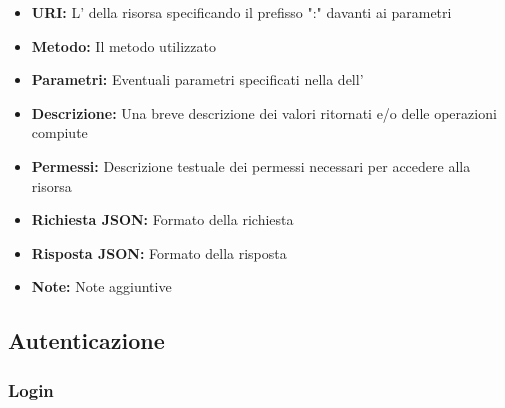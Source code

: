         \begin{itemize}
            \item \textbf{URI:} L' della risorsa specificando il prefisso
                ":" davanti ai parametri
            \item \textbf{Metodo:} Il metodo  utilizzato
            \item \textbf{Parametri:} Eventuali parametri specificati nella 
                dell'
            \item \textbf{Descrizione:} Una breve descrizione dei valori ritornati e/o delle
                operazioni compiute
            \item \textbf{Permessi:} Descrizione testuale dei permessi necessari
                per accedere alla risorsa
            \item \textbf{Richiesta JSON:} Formato della richiesta 
            \item \textbf{Risposta JSON:} Formato della risposta 
            \item \textbf{Note:} Note aggiuntive
        \end{itemize}

\subsection{Autenticazione}

    \subsubsection{Login}

